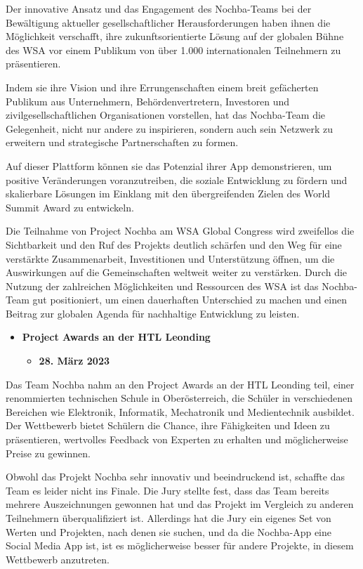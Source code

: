 Der innovative Ansatz und das Engagement des Nochba-Teams bei der Bewältigung aktueller gesellschaftlicher Herausforderungen haben ihnen die Möglichkeit verschafft, ihre zukunftsorientierte Lösung auf der globalen Bühne des WSA vor einem Publikum von über 1.000 internationalen Teilnehmern zu präsentieren.

Indem sie ihre Vision und ihre Errungenschaften einem breit gefächerten Publikum aus Unternehmern, Behördenvertretern, Investoren und zivilgesellschaftlichen Organisationen vorstellen, hat das Nochba-Team die Gelegenheit, nicht nur andere zu inspirieren, sondern auch sein Netzwerk zu erweitern und strategische Partnerschaften zu formen.

Auf dieser Plattform können sie das Potenzial ihrer App demonstrieren, um positive Veränderungen voranzutreiben, die soziale Entwicklung zu fördern und skalierbare Lösungen im Einklang mit den übergreifenden Zielen des World Summit Award zu entwickeln.

Die Teilnahme von Project Nochba am WSA Global Congress wird zweifellos die Sichtbarkeit und den Ruf des Projekts deutlich schärfen und den Weg für eine verstärkte Zusammenarbeit, Investitionen und Unterstützung öffnen, um die Auswirkungen auf die Gemeinschaften weltweit weiter zu verstärken. Durch die Nutzung der zahlreichen Möglichkeiten und Ressourcen des WSA ist das Nochba-Team gut positioniert, um einen dauerhaften Unterschied zu machen und einen Beitrag zur globalen Agenda für nachhaltige Entwicklung zu leisten.

\begin{itemize}
    \item \textbf{Project Awards an der HTL Leonding}
          \begin{itemize}
              \item \textbf{28. März 2023}
          \end{itemize}
\end{itemize}

Das Team Nochba nahm an den Project Awards an der HTL Leonding teil, einer renommierten technischen Schule in Oberösterreich, die Schüler in verschiedenen Bereichen wie Elektronik, Informatik, Mechatronik und Medientechnik ausbildet. Der Wettbewerb bietet Schülern die Chance, ihre Fähigkeiten und Ideen zu präsentieren, wertvolles Feedback von Experten zu erhalten und möglicherweise Preise zu gewinnen.

Obwohl das Projekt Nochba sehr innovativ und beeindruckend ist, schaffte das Team es leider nicht ins Finale. Die Jury stellte fest, dass das Team bereits mehrere Auszeichnungen gewonnen hat und das Projekt im Vergleich zu anderen Teilnehmern überqualifiziert ist. Allerdings hat die Jury ein eigenes Set von Werten und Projekten, nach denen sie suchen, und da die Nochba-App eine Social Media App ist, ist es möglicherweise besser für andere Projekte, in diesem Wettbewerb anzutreten.

